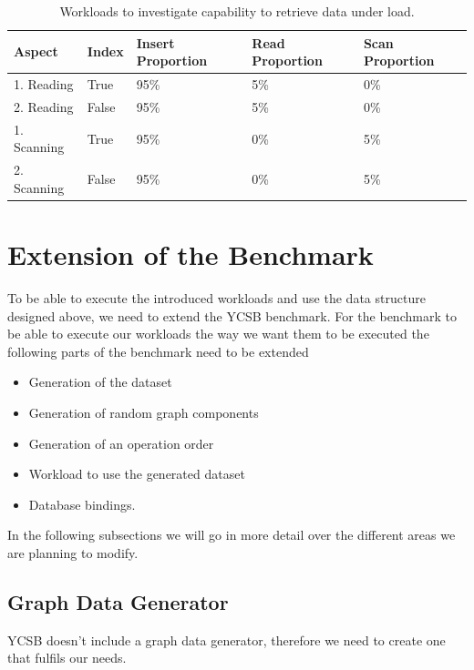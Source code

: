 \begin{table}[!h]
  \begin{minipage}{\textwidth}
    \begin{tabularx}{\textwidth}{ | X | X | X | X | X | }
      \hline
      Aspect & Index & Insert Proportion & Read Proportion & Scan Proportion \\ \hline
      1. Reading & True & 95\% & 5\% & 0\% \\ \hline
      2. Reading & False & 95\% & 5\% & 0\% \\ \hline
      1. Scanning & True & 95\% & 0\% & 5\% \\ \hline
      2. Scanning & False & 95\% & 0\% & 5\% \\ \hline
    \end{tabularx}
  \end{minipage}
  \caption{Workloads to investigate capability to retrieve data under load.}
  \label{tab:retrievingUnderLoad}
\end{table}

\section{Extension of the Benchmark}
\label{ch:design:se:extensionOfTheBenchmark}
To be able to execute the introduced workloads and use the data structure designed above,
we need to extend the YCSB benchmark.
For the benchmark to be able to execute our workloads the way we want them to be executed the following parts of the benchmark need to be extended

\begin{itemize}
  \item Generation of the dataset
  \item Generation of random graph components
  \item Generation of an operation order
  \item Workload to use the generated dataset
  \item Database bindings.
\end{itemize}

In the following subsections we will go in more detail over the different areas we are planning to modify.

\subsection{Graph Data Generator}
YCSB doesn't include a graph data generator,
therefore we need to create one that fulfils our needs.

